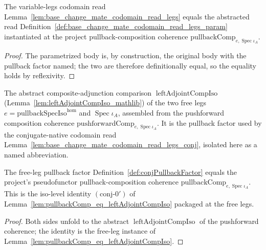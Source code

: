 \begin{lemma}

  \label{lem:base_change_mate_codomain_read_legs_eq_param}
  The variable-legs codomain read Lemma~\ref{lem:base_change_mate_codomain_read_legs} equals the
  abstracted read Definition~\ref{def:base_change_mate_codomain_read_legs_param} instantiated at the
  project pullback-composition coherence \(\mathrm{pullbackComp}_{e,\operatorname{Spec}\iota_A}\).
\end{lemma}
\begin{proof}
  The parametrized body is, by construction, the original body with the pullback factor named; the two
  are therefore definitionally equal, so the equality holds by reflexivity.
\end{proof}

\begin{definition}

  \label{def:conjPullbackFactor}
  The abstract composite-adjunction comparison \(\operatorname{leftAdjointCompIso}\)
  (Lemma~\ref{lem:leftAdjointCompIso_mathlib}) of the two free legs
  \(e = \mathrm{pullbackSpecIso}^{\mathrm{hom}}\) and \(\operatorname{Spec}\iota_A\), assembled from the
  pushforward composition coherence \(\mathrm{pushforwardComp}_{e,\operatorname{Spec}\iota_A}\). It is
  the pullback factor used by the conjugate-native codomain read
  Lemma~\ref{lem:base_change_mate_codomain_read_legs_conj}, isolated here as a named abbreviation.
\end{definition}

\begin{lemma}

  \label{lem:conjPullbackFactor_eq_pullbackComp}
  The free-leg pullback factor Definition~\ref{def:conjPullbackFactor} equals the project's
  pseudofunctor pullback-composition coherence \(\mathrm{pullbackComp}_{e,\operatorname{Spec}\iota_A}\).
  This is the iso-level identity \((\mathrm{conj}\text{-}0')\) of
  Lemma~\ref{lem:pullbackComp_eq_leftAdjointCompIso} packaged at the free legs.
\end{lemma}
\begin{proof}
  Both sides unfold to the abstract \(\operatorname{leftAdjointCompIso}\) of the pushforward coherence;
  the identity is the free-leg instance of Lemma~\ref{lem:pullbackComp_eq_leftAdjointCompIso}.
\end{proof}

